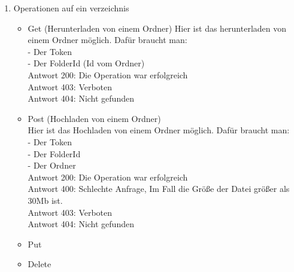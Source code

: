 \begin{enumerate}
\item Operationen auf ein verzeichnis
	\begin{itemize}
	\item Get (Herunterladen von einem Ordner)
Hier ist das herunterladen von einem Ordner m\"oglich. Daf\"ur braucht man: \\
	- Der Token \\
	- Der FolderId (Id vom  Ordner) \\
Antwort 200: Die Operation war erfolgreich \\ 
Antwort 403: Verboten \\
Antwort 404: Nicht gefunden
	\item Post (Hochladen von einem Ordner) \\
Hier ist das Hochladen von einem Ordner m\"oglich. Daf\"ur braucht man: \\
	- Der Token \\
	- Der FolderId \\
	- Der Ordner\\
Antwort 200: Die Operation war erfolgreich \\ 
Antwort 400: Schlechte Anfrage, Im Fall die Gr\"o{\ss}e der Datei gr\"o{\ss}er als 30Mb ist. \\
Antwort 403: Verboten \\
Antwort 404: Nicht gefunden
	\item Put
	\item Delete
	\end{itemize}
\end{enumerate}